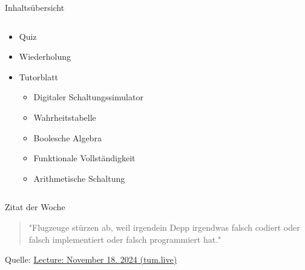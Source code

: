 \documentclass[
  german,            %
  aspectratio=169,    %
]{tumbeamer}
\begin{document}
\begin{frame}[c]{Inhaltsübersicht}{}
  \begin{columns}[c]
    \begin{column}{1\textwidth}
      \begin{itemize}
        \item Quiz
        \item Wiederholung
        \item Tutorblatt
        \begin{itemize}
          \item Digitaler Schaltungssimulator
          \item Wahrheitstabelle
          \item Boolesche Algebra
          \item Funktionale Vollständigkeit
          \item Arithmetische Schaltung
        \end{itemize}
      \end{itemize}
    \end{column}
  \end{columns}
\end{frame}

\begin{frame}[c]{}{}
  \begin{center}
    \vspace{0.5cm}
    \begin{block}{Zitat der Woche}
      \vspace{0.5cm}
      \begin{quote}
        "Flugzeuge stürzen ab, weil irgendein Depp irgendwas falsch codiert oder falsch implementiert oder falsch programmiert hat."    
        \vspace{0.5cm}
      \end{quote}
      \vspace{0.5cm}
    \end{block}
    \vspace{0.5cm}
    Quelle: \href{https://tum.live/w/ws24EidR/50021?t=2268}{Lecture: November 18. 2024 (tum.live)}
  \end{center}
\end{frame}
\end{document}
